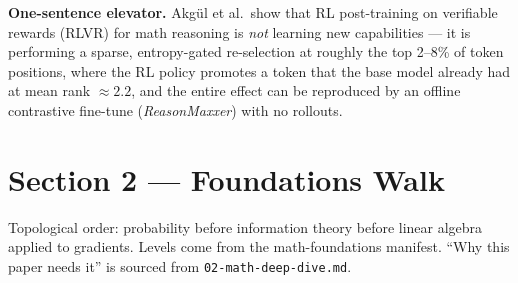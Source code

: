 \documentclass[11pt]{article}
\begin{document}
\textbf{One-sentence elevator.} Akg\"ul et al.\ show that RL post-training on verifiable rewards (RLVR) for math reasoning is \emph{not} learning new capabilities --- it is performing a sparse, entropy-gated re-selection at roughly the top 2--8\% of token positions, where the RL policy promotes a token that the base model already had at mean rank $\approx 2.2$, and the entire effect can be reproduced by an offline contrastive fine-tune (\emph{ReasonMaxxer}) with no rollouts.

\section*{Section 2 --- Foundations Walk}

Topological order: probability before information theory before linear algebra applied to gradients. Levels come from the math-foundations manifest. ``Why this paper needs it'' is sourced from \texttt{02-math-deep-dive.md}.
\end{document}
